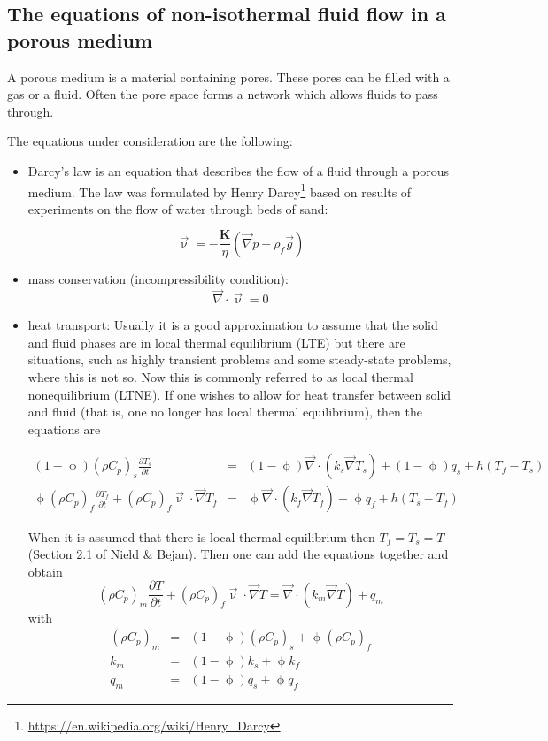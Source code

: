 \subsection{The equations of non-isothermal fluid flow in a porous medium}

A porous medium is a material containing pores. These pores can 
be filled with a gas or a fluid. Often the pore space forms a network which allows fluids to pass through.

The equations under consideration are the following:
\begin{itemize}
\item Darcy's law is an equation that describes the flow of a fluid through a porous medium. The law was formulated by Henry Darcy\footnote{\url{https://en.wikipedia.org/wiki/Henry_Darcy}}
based on results of experiments on the flow of water through beds of sand:

\begin{equation}
\vec{\upnu} = -\frac{{\bm K}}{\eta} (\vec\nabla p + \rho_f \vec{g})
\label{eq:darcy}
\end{equation}


\item mass conservation (incompressibility condition):
\begin{equation}
\vec\nabla\cdot\vec\upnu = 0
\label{eq:porous:incomp}
\end{equation}
\item heat transport:
Usually it is a good approximation to assume that the solid and fluid phases are in local
thermal equilibrium (LTE) but there are situations, such as highly transient problems and
some steady-state problems, where this is not so. Now this is commonly referred to as local thermal nonequilibrium (LTNE). If one wishes to allow for heat transfer between solid and fluid (that is, one no longer has local thermal equilibrium), then the equations are

\begin{eqnarray}
(1-\upphi)(\rho C_p)_s \frac{\partial T_s}{\partial t}
&=& (1-\upphi) \vec\nabla \cdot (k_s \vec\nabla T_s)
+ (1-\upphi) q_s + h (T_f-T_s) \\
\upphi (\rho C_p)_f  \frac{\partial T_f}{\partial t}
+ (\rho C_p)_f \vec\upnu \cdot \vec\nabla T_f 
&=& \upphi \vec\nabla \cdot (k_f \vec\nabla T_f)
+ \upphi q_f + h (T_s-T_f)
\end{eqnarray}

When it is assumed that there is local thermal equilibrium then $T_f=T_s=T$ (Section 2.1 of Nield \& Bejan). 
Then one can add the equations together and obtain 
\[
(\rho C_p)_m \frac{\partial T}{\partial t} 
+
(\rho C_p)_f \vec{\upnu} \cdot \vec\nabla T 
= 
\vec\nabla \cdot ( k_m \vec\nabla T)
+ q_m
\]
with 
\begin{eqnarray}
(\rho C_p)_m &=& (1-\upphi) (\rho C_p)_s + \upphi (\rho C_p)_ f\\ k_m &=& (1-\upphi) k_s + \upphi k_f \\
q_m &=& (1-\upphi) q_s + \upphi q_f 
\end{eqnarray}


\end{itemize}
